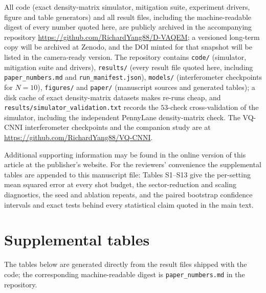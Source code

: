 \documentclass[ASNA,twocolumn]{USG}
\renewcommand{\topfraction}{0.92}
\renewcommand{\bottomfraction}{0.80}
\renewcommand{\textfraction}{0.06}
\renewcommand{\floatpagefraction}{0.85}
\renewcommand{\dbltopfraction}{0.92}
\renewcommand{\dblfloatpagefraction}{0.85}
\begin{document}
All code (exact density-matrix simulator, mitigation suite, experiment drivers,
figure and table generators) and all result files, including the
machine-readable digest of every number quoted here, are publicly archived in
the accompanying repository \url{https://github.com/RichardYang88/D-VAQEM}; a
versioned long-term copy will be archived at Zenodo, and the DOI minted for that
snapshot will be listed in the camera-ready version.  The repository contains
\texttt{code/} (simulator, mitigation suite and drivers), \texttt{results/}
(every result file quoted here, including \texttt{paper\_numbers.md} and
\texttt{run\_manifest.json}), \texttt{models/} (interferometer checkpoints for
$N=10$), \texttt{figures/} and \texttt{paper/} (manuscript sources and generated
tables); a disk cache of exact density-matrix datasets makes re-runs cheap, and
\texttt{results/simulator\_validation.txt} records the $53$-check
cross-validation of the simulator, including the independent PennyLane
density-matrix check.  The VQ-CNNI interferometer checkpoints and the companion
study are at \url{https://github.com/RichardYang88/VQ-CNNI}.%

\clearpage


Additional supporting information may be found in the online version of this
article at the publisher's website.  For the reviewers' convenience the
supplemental tables are appended to this manuscript file: Tables S1--S13 give
the per-setting mean squared error at every shot budget, the sector-reduction and
scaling diagnostics, the seed and ablation repeats, and the paired bootstrap
confidence intervals and exact tests behind every statistical claim quoted in
the main text.

\clearpage
\setcounter{table}{0}
\renewcommand{\thetable}{S\arabic{table}}
\setcounter{topnumber}{6}
\setcounter{bottomnumber}{3}
\setcounter{totalnumber}{9}
\setcounter{dbltopnumber}{6}
\renewcommand{\topfraction}{0.98}
\renewcommand{\bottomfraction}{0.90}
\renewcommand{\textfraction}{0.02}
\renewcommand{\floatpagefraction}{0.95}
\renewcommand{\dbltopfraction}{0.98}
\renewcommand{\dblfloatpagefraction}{0.95}
\section*{Supplemental tables}
\label{app:supplement}
The tables below are generated directly from the result files shipped with the
code; the corresponding machine-readable digest is \texttt{paper\_numbers.md} in
the repository.

\clearpage
\end{document}
